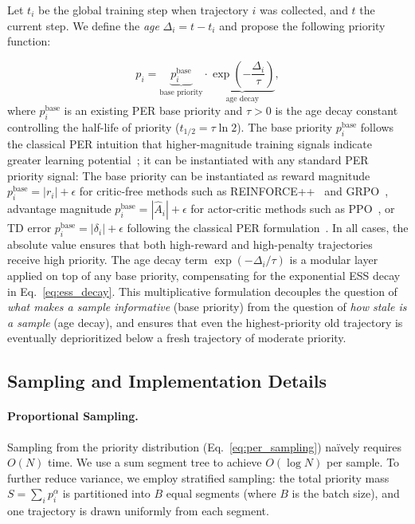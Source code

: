 \documentclass[runningheads]{llncs}
\begin{document}
Let $t_i$ be the global training step when trajectory $i$ was collected, and $t$ the current step. We define the \emph{age} $\Delta_i = t - t_i$ and propose the following priority function:

\begin{equation}
    p_i = \underbrace{p_i^{\text{base}}}_{\text{base priority}} \cdot \underbrace{\exp\!\left(-\frac{\Delta_i}{\tau}\right)}_{\text{age decay}},
    \label{eq:fresh_priority}
\end{equation}
where $p_i^{\text{base}}$ is an existing PER base priority and $\tau > 0$ is the age decay constant controlling the half-life of priority ($t_{1/2} = \tau \ln 2$). The base priority $p_i^{\text{base}}$ follows the classical PER intuition that higher-magnitude training signals indicate greater learning potential~\cite{schaul2016per}; it can be instantiated with any standard PER priority signal:
The base priority can be instantiated as reward magnitude $p_i^{\text{base}} = |r_i| + \epsilon$ for critic-free methods such as REINFORCE++~\cite{hu2025reinforce++} and GRPO~\cite{shao2024deepseekmath}, advantage magnitude $p_i^{\text{base}} = |\hat{A}_i| + \epsilon$ for actor-critic methods such as PPO~\cite{schulman2017ppo}, or TD error $p_i^{\text{base}} = |\delta_i| + \epsilon$ following the classical PER formulation~\cite{schaul2016per}. In all cases, the absolute value ensures that both high-reward and high-penalty trajectories receive high priority.
The age decay term $\exp(-\Delta_i / \tau)$ is a modular layer applied on top of any base priority, compensating for the exponential ESS decay in Eq.~\eqref{eq:ess_decay}. This multiplicative formulation decouples the question of \emph{what makes a sample informative} (base priority) from the question of \emph{how stale is a sample} (age decay), and ensures that even the highest-priority old trajectory is eventually deprioritized below a fresh trajectory of moderate priority.

\subsection{Sampling and Implementation Details}
\label{sec:sampling}

\paragraph{Proportional Sampling.}
Sampling from the priority distribution (Eq.~\eqref{eq:per_sampling}) na\"ively requires $O(N)$ time. We use a sum segment tree to achieve $O(\log N)$ per sample. To further reduce variance, we employ stratified sampling: the total priority mass $S = \sum_i p_i^\alpha$ is partitioned into $B$ equal segments (where $B$ is the batch size), and one trajectory is drawn uniformly from each segment.
\end{document}
